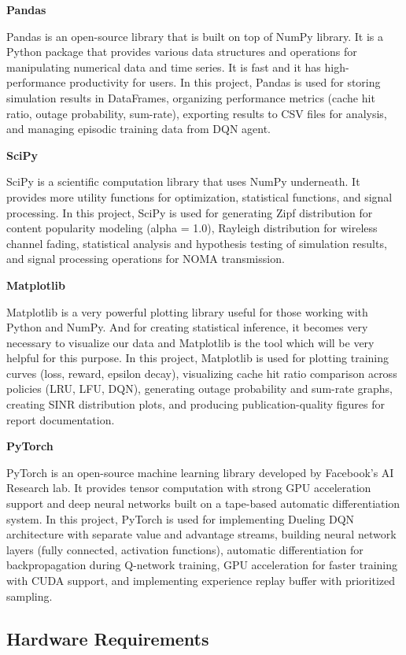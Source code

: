 \documentclass[12pt,a4paper]{article}
\begin{document}
\textbf{Pandas}

Pandas is an open-source library that is built on top of NumPy library. It is a Python package that provides various data structures and operations for manipulating numerical data and time series. It is fast and it has high-performance productivity for users. In this project, Pandas is used for storing simulation results in DataFrames, organizing performance metrics (cache hit ratio, outage probability, sum-rate), exporting results to CSV files for analysis, and managing episodic training data from DQN agent.

\textbf{SciPy}

SciPy is a scientific computation library that uses NumPy underneath. It provides more utility functions for optimization, statistical functions, and signal processing. In this project, SciPy is used for generating Zipf distribution for content popularity modeling (alpha = 1.0), Rayleigh distribution for wireless channel fading, statistical analysis and hypothesis testing of simulation results, and signal processing operations for NOMA transmission.

\textbf{Matplotlib}

Matplotlib is a very powerful plotting library useful for those working with Python and NumPy. And for creating statistical inference, it becomes very necessary to visualize our data and Matplotlib is the tool which will be very helpful for this purpose. In this project, Matplotlib is used for plotting training curves (loss, reward, epsilon decay), visualizing cache hit ratio comparison across policies (LRU, LFU, DQN), generating outage probability and sum-rate graphs, creating SINR distribution plots, and producing publication-quality figures for report documentation.

\textbf{PyTorch}

PyTorch is an open-source machine learning library developed by Facebook's AI Research lab. It provides tensor computation with strong GPU acceleration support and deep neural networks built on a tape-based automatic differentiation system. In this project, PyTorch is used for implementing Dueling DQN architecture with separate value and advantage streams, building neural network layers (fully connected, activation functions), automatic differentiation for backpropagation during Q-network training, GPU acceleration for faster training with CUDA support, and implementing experience replay buffer with prioritized sampling.


\subsection{Hardware Requirements}
\end{document}
